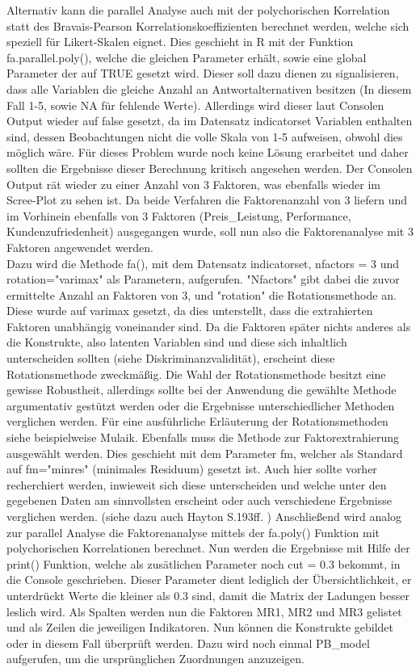 \documentclass{article}\usepackage[]{graphicx}\usepackage[]{color}
\begin{document}
Alternativ kann die parallel Analyse auch mit der polychorischen Korrelation statt des Bravais-Pearson Korrelationskoeffizienten berechnet werden, welche sich speziell für Likert-Skalen eignet.\cite{joreskog1986prelis} Dies geschieht in R mit der Funktion fa.parallel.poly(), welche die gleichen Parameter erhält, sowie eine global Parameter der auf TRUE gesetzt wird. Dieser soll dazu dienen zu signalisieren, dass alle Variablen die gleiche Anzahl an Antwortalternativen besitzen (In diesem Fall 1-5, sowie NA für fehlende Werte). Allerdings wird dieser laut Consolen Output wieder auf false gesetzt, da im Datensatz indicatorset Variablen enthalten sind, dessen Beobachtungen nicht die volle Skala von 1-5 aufweisen, obwohl dies möglich wäre. Für dieses Problem wurde noch keine Lösung erarbeitet und daher sollten die Ergebnisse dieser Berechnung kritisch angesehen werden. Der Consolen Output rät wieder zu einer Anzahl von 3 Faktoren, was ebenfalls wieder im Scree-Plot zu sehen ist. Da beide Verfahren die Faktorenanzahl von 3 liefern und im Vorhinein ebenfalls von 3 Faktoren (Preis\_Leistung, Performance, Kundenzufriedenheit) ausgegangen wurde, soll nun also die Faktorenanalyse mit 3 Faktoren angewendet werden.\\
Dazu wird die Methode fa(), mit dem Datensatz indicatorset, nfactors = 3 und rotation="varimax" als Parametern, aufgerufen. "Nfactors" gibt dabei die zuvor ermittelte Anzahl an Faktoren von 3, und "rotation" die Rotationsmethode an. Diese wurde auf varimax gesetzt, da dies unterstellt, dass die extrahierten Faktoren unabhängig voneinander sind. Da die Faktoren später nichts anderes als die Konstrukte, also latenten Variablen sind und diese sich inhaltlich unterscheiden sollten (siehe Diskriminanzvalidität), erscheint diese Rotationsmethode zweckmäßig. Die Wahl der Rotationsmethode besitzt eine gewisse Robustheit\cite{zwick1986comparison}, allerdings sollte bei der Anwendung die gewählte Methode argumentativ gestützt werden oder die Ergebnisse unterschiedlicher Methoden verglichen werden. Für eine ausführliche Erläuterung der Rotationsmethoden siehe beispielweise Mulaik.\cite{mulaik1972foundations} Ebenfalls muss die Methode zur Faktorextrahierung ausgewählt werden. Dies geschieht mit dem Parameter fm, welcher als Standard auf fm="minres" (minimales Residuum) gesetzt ist. Auch hier sollte vorher recherchiert werden, inwieweit sich diese unterscheiden und welche unter den gegebenen Daten am sinnvollsten erscheint oder auch verschiedene Ergebnisse verglichen werden. (siehe dazu auch Hayton S.193ff.\cite{hayton2004factor} ) Anschließend wird analog zur parallel Analyse die Faktorenanalyse mittels der fa.poly() Funktion mit polychorischen Korrelationen berechnet. Nun werden die Ergebnisse mit Hilfe der print() Funktion, welche als zusätlichen Parameter noch cut = 0.3 bekommt, in die Console geschrieben. Dieser Parameter dient lediglich der Übersichtlichkeit, er unterdrückt Werte die kleiner als 0.3 sind, damit die Matrix der Ladungen besser leslich wird. Als Spalten werden nun die Faktoren MR1, MR2 und MR3 gelistet und als Zeilen die jeweiligen Indikatoren. Nun können die Konstrukte gebildet oder in diesem Fall überprüft werden. Dazu wird noch einmal PB\_model aufgerufen, um die ursprünglichen Zuordnungen anzuzeigen.\\
\end{document}
